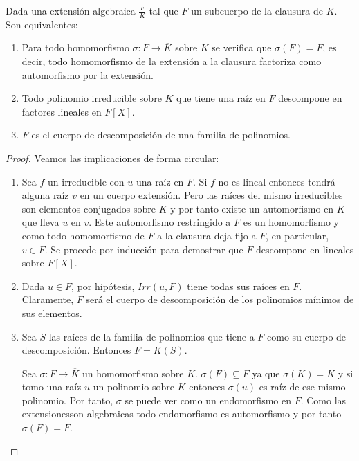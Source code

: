 \begin{proposition}
Dada una extensión algebraica $\frac{F}{K}$ tal que $F$ un subcuerpo de la clausura de $K$. Son equivalentes:

\begin{enumerate}
\item Para todo homomorfismo $\sigma:F \to \overline{K}$ sobre $K$ se verifica que $\sigma(F) = F$, es decir, todo homomorfismo de la extensión a la clausura factoriza como automorfismo por la extensión.
\item Todo polinomio irreducible sobre $K$ que tiene una raíz en $F$ descompone en factores lineales en $F[X]$. 
\item $F$ es el cuerpo de descomposición de una familia de polinomios. 
\end{enumerate}
\end{proposition}
\begin{proof}
Veamos las implicaciones de forma circular:

\begin{enumerate}
\item Sea $f$ un irreducible con $u$ una raíz en $F$. Si $f$ no es lineal entonces tendrá alguna raíz $v$ en un cuerpo extensión. Pero las raíces del mismo irreducibles son elementos conjugados sobre $K$ y por tanto existe un automorfismo en $\overline{K}$ que lleva $u$ en $v$. Este automorfismo restringido a $F$ es un homomorfismo y como todo homomorfismo de $F$ a la clausura deja fijo a $F$, en particular, $v \in F$. Se procede por inducción para demostrar que $F$ descompone en lineales sobre $F[X]$. 
\item Dada $u \in F$, por hipótesis, $Irr(u,F)$ tiene todas sus raíces en $F$. Claramente, $F$ será el cuerpo de descomposición de los polinomios mínimos de sus elementos.
\item Sea $S$ las raíces de la familia de polinomios que tiene a $F$ como su cuerpo de descomposición. Entonces $F = K(S)$. 

Sea $\sigma:F \to \overline{K}$ un homomorfismo sobre $K$. $\sigma(F) \subseteq F$ ya que $\sigma(K) = K$ y si tomo una raíz $u$ un polinomio sobre $K$ entonces $\sigma(u)$ es raíz de ese mismo polinomio. Por tanto, $\sigma$ se puede ver como un endomorfismo en $F$. Como las extensionesson algebraicas todo endomorfismo es automorfismo y por tanto $\sigma(F) = F$. 
\end{enumerate}
\end{proof}

